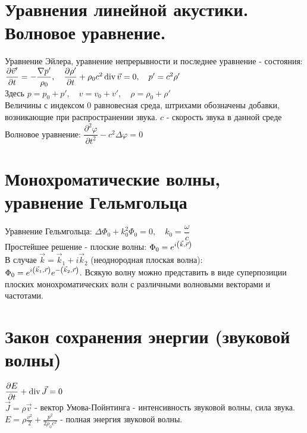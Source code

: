 \begin{multicols*}{2}
		\section{Уравнения линейной акустики. Волновое уравнение.}
		Уравнение Эйлера, уравнение непрерывности и последнее уравнение - состояния:\\
		$\dfrac{\partial \vec{v}'}{\partial t} = -\dfrac{\nabla p'}{\rho_0}, \quad \dfrac{\partial \rho'}{\partial t} + \rho_0 c^2 \operatorname{div} \vec{v} = 0, \quad p' = c^2 \rho'$\\
		Здесь $p = p_0 + p', \quad v = v_0 + v', \quad\rho  = \rho_0 + \rho'$\\
		Величины с индексом 0 равновесная среда, штрихами обозначены добавки, возникающие при распространении звука. $c$ - скорость звука в данной среде\\
		Волновое уравнение:
		$\dfrac{\partial^2 \varphi}{\partial t^2} - c^2 \Delta\varphi = 0$
		
		\section{Монохроматические волны, уравнение Гельмгольца}
		Уравнение Гельмгольца:
		$\Delta \Phi_0+k_0^2 \Phi_0 = 0,\quad k_0=\dfrac{\omega}{c}$\\
		Простейшее решение - плоские волны:
		$\Phi_0 = e^{i\qty(\vec{k}, \vec{r})}$\\
		В случае $\vec{k} = \vec{k}_1 + i\vec{k}_2$ (неоднородная плоская волна):\\
		$\Phi_0 = e^{i\qty(\vec{k}_1, \vec{r})}e^{-\qty(\vec{k}_2,\vec{r})}$.
		Всякую волну можно представить в виде суперпозиции плоских монохроматических волн с различными волновыми векторами и частотами.
		
		\section{Закон сохранения энергии (звуковой волны)}
		$\dfrac{\partial E}{\partial t} + \operatorname{div}\vec{J}=0$\\
		$\vec{J} = \rho \vec{v}$ - вектор Умова-Пойнтинга - интенсивность звуковой волны, сила звука. \\
		$E = \rho \frac{v^2}{2} + \frac{p^2}{2\rho_0 c^2}$ - полная энергия звуковой волны.
		
	\end{multicols*}

